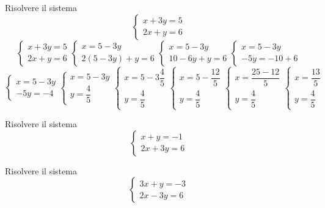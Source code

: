 \begin{exercise}{}
Risolvere il sistema 
\[
\begin{cases}
	x+3y=5\\
	2x+y=6
\end{cases}
\]
	\tcblower
\[
\begin{cases}
	x+3y=5\\
	2x+y=6
\end{cases}
\begin{cases}
	x=5-3y\\
	2(5-3y)+y=6
\end{cases}
\begin{cases}
	x=5-3y\\
	10-6y+y=6
\end{cases}
\begin{cases}
	x=5-3y\\
	-5y=-10+6
\end{cases}
\]
\[
\begin{cases}
		x=5-3y\\
	-5y=-4
\end{cases}
\begin{cases}
	x=5-3y\\
	y=\dfrac{4}{5}
\end{cases}
\begin{cases}
	x=5-3\dfrac{4}{5}\\
	y=\dfrac{4}{5}
\end{cases}
\begin{cases}
	x=5-\dfrac{12}{5}\\
	y=\dfrac{4}{5}
\end{cases}
\begin{cases}
	x=\dfrac{25-12}{5}\\
	y=\dfrac{4}{5}
\end{cases}
\begin{cases}
	x=\dfrac{13}{5}\\
	y=\dfrac{4}{5}
\end{cases}
\]
\end{exercise}
\begin{exercise}[no solution]
Risolvere il sistema 
\[
\begin{cases}
	x+y=-1\\
	2x+3y=6
\end{cases}
\]
\end{exercise}
\begin{exercise}[no solution]
	Risolvere il sistema 
	\[
	\begin{cases}
		3x+y=-3\\
		2x-3y=6
	\end{cases}
	\]
\end{exercise}
